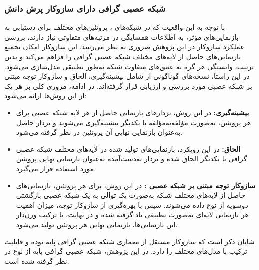  \subsubsection{شبکه عصبی گرافی دارای سازوکار پرش دانش}
 با توجه به این واقعیت که در شبکه‌های ، پروتئین‌های مختلف برای دستیابی به بازنمایی‌های مؤثر، به اطلاعات همسایگی در مرتبه‌های متفاوتی نیاز دارند، بررسی عملکرد سازوکار  در این پژوهش ضروری به نظر می‌رسد. این سازوکار امکان تجمیع بازنمایی‌های حاصل از لایه‌های مختلف شبکه عصبی گرافی را فراهم می‌کند و بدین ترتیب، وابستگی هر گره به عمق‌های متفاوت شبکه به‌طور تطبیقی مدل‌سازی می‌شود. در این راستا، نسخه‌های گوناگونی از  شامل بیشینه‌گیری، الحاق و سازوکار توجه مبتنی بر شبکه عصبی  مورد بررسی و ارزیابی قرار گرفته‌اند. در ادامه، مروری کلی بر هر یک از این روش‌ها ارائه می‌شود:
 \begin{itemize}
 	\item \textbf{بیشینه‌گیری:}  
 	در این روش، بردارهای بازنمایی حاصل از هر لایه شبکه عصبی برای هر پروتئین، به‌صورت مؤلفه‌به‌مؤلفه با یکدیگر بیشینه‌گیری می‌شوند و بردار حاصل به‌عنوان بازنمایی نهایی آن پروتئین در نظر گرفته می‌شود.
 	
 	\item \textbf{الحاق:}  
 	در این رویکرد، بازنمایی‌های تولید شده در لایه‌های مختلف شبکه عصبی گرافی با یکدیگر الحاق شده و بردار به‌دست‌آمده به‌عنوان بازنمایی نهایی پروتئین مورد استفاده قرار می‌گیرد.
 
 \item \textbf{سازوکار توجه مبتنی بر شبکه عصبی :}  
 در این روش، برای هر پروتئین، بازنمایی‌های حاصل از لایه‌های مختلف شبکه به‌صورت یک توالی به یک شبکه عصبی بازگشتی دوسویه از نوع  داده می‌شوند. سپس با بهره‌گیری از سازوکار توجه، میزان اهمیت هر بازنمایی لایه‌ای به‌صورت تطبیقی یاد گرفته شده و در نهایت، با ترکیب وزن‌دار این بازنمایی‌ها، بازنمایی نهایی هر پروتئین تولید می‌شود.
 \end{itemize}
 شایان ذکر است که سازوکار  مستقل از معماری شبکه عصبی گرافی پایه بوده و قابلیت ترکیب با مدل‌های مختلف را دارد. در این پژوهش، شبکه عصبی گرافی پایه از نوع  در نظر گرفته شده است.

